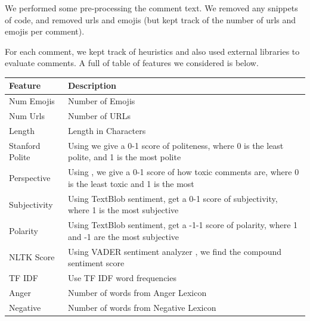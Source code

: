 \documentclass[conference]{IEEEtran}
\begin{document}
We performed some pre-processing the comment text. We removed any snippets of code, and removed urls and emojis (but kept track of the number of urls and emojis per comment). 


For each comment, we kept track of heuristics and also used external libraries to evaluate comments. A full of table of features we considered is below. 

\begin{table}[]
	\begin{tabular}{|p{2cm}|p{6cm}|} \hline
		\textbf{Feature} & \textbf{Description}                                                                                        \\ \hline
		Num Emojis       & Number of Emojis                                                                                             \\ \hline
		Num Urls         & Number of URLs                                                                                              \\ \hline
		Length           & Length in Characters                                                                                        \\ \hline
		Stanford Polite  & Using \cite{b8} we give a 0-1 score of politeness, where 0 is the least polite, and 1 is the most polite     \\ \hline
		Perspective      & Using \cite{b7}, we give a 0-1 score of how toxic comments are, where 0 is the least toxic and 1 is the most \\ \hline
		Subjectivity     & Using TextBlob sentiment, get a 0-1 score of subjectivity, where 1 is the most subjective                   \\ \hline
		Polarity         & Using TextBlob sentiment, get a -1-1 score of polarity, where 1 and -1 are the most subjective              \\ \hline
		NLTK Score       & Using VADER sentiment analyzer \cite{b9}, we find the compound sentiment score                             \\ \hline
		TF IDF           & Use TF IDF word frequencies                                                                                 \\ \hline
		Anger            & Number of words from Anger Lexicon \cite{b10}                                                               \\ \hline
		Negative         & Number of words from Negative Lexicon \cite{b10} \\  \hline                                                           
	\end{tabular}
\end{table}
\end{document}
